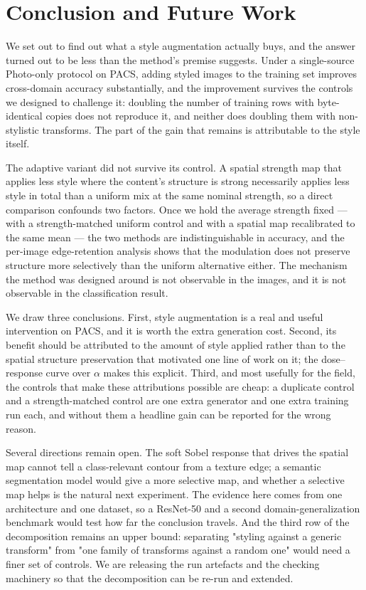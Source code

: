 \section{Conclusion and Future Work}
\label{sec:conclusion}

We set out to find out what a style augmentation actually buys, and the answer turned out to be less than the method's premise suggests. Under a single-source Photo-only protocol on PACS, adding styled images to the training set improves cross-domain accuracy substantially, and the improvement survives the controls we designed to challenge it: doubling the number of training rows with byte-identical copies does not reproduce it, and neither does doubling them with non-stylistic transforms. The part of the gain that remains is attributable to the style itself.

The adaptive variant did not survive its control. A spatial strength map that applies less style where the content's structure is strong necessarily applies less style in total than a uniform mix at the same nominal strength, so a direct comparison confounds two factors. Once we hold the average strength fixed --- with a strength-matched uniform control and with a spatial map recalibrated to the same mean --- the two methods are indistinguishable in accuracy, and the per-image edge-retention analysis shows that the modulation does not preserve structure more selectively than the uniform alternative either. The mechanism the method was designed around is not observable in the images, and it is not observable in the classification result.

We draw three conclusions. First, style augmentation is a real and useful intervention on PACS, and it is worth the extra generation cost. Second, its benefit should be attributed to the amount of style applied rather than to the spatial structure preservation that motivated one line of work on it; the dose--response curve over $\alpha$ makes this explicit. Third, and most usefully for the field, the controls that make these attributions possible are cheap: a duplicate control and a strength-matched control are one extra generator and one extra training run each, and without them a headline gain can be reported for the wrong reason.

Several directions remain open. The soft Sobel response that drives the spatial map cannot tell a class-relevant contour from a texture edge; a semantic segmentation model would give a more selective map, and whether a selective map helps is the natural next experiment. The evidence here comes from one architecture and one dataset, so a ResNet-50 and a second domain-generalization benchmark would test how far the conclusion travels. And the third row of the decomposition remains an upper bound: separating "styling against a generic transform" from "one family of transforms against a random one" would need a finer set of controls. We are releasing the run artefacts and the checking machinery so that the decomposition can be re-run and extended.
